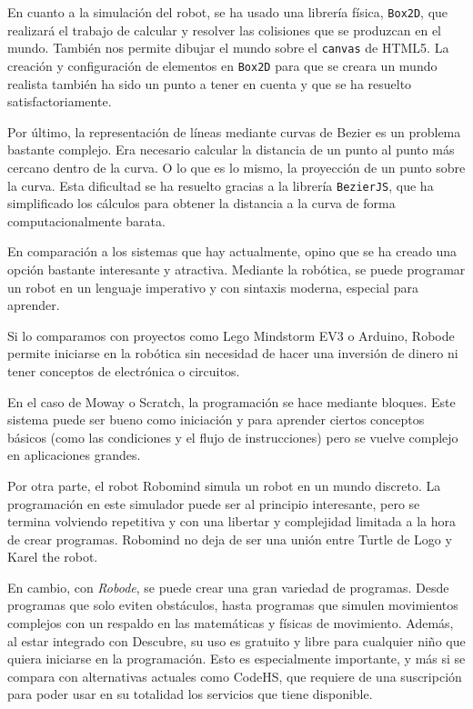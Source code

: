 
En cuanto a la simulación del robot, se ha usado una librería física, \texttt{Box2D}, que realizará el trabajo de calcular y resolver las colisiones que se produzcan en el mundo. También nos permite dibujar el mundo sobre el \texttt{canvas} de HTML5. La creación y configuración de elementos en \texttt{Box2D} para que se creara un mundo realista también ha sido un punto a tener en cuenta y que se ha resuelto satisfactoriamente. 

Por último, la representación de líneas mediante curvas de Bezier es un problema bastante complejo. Era necesario calcular la distancia de un punto al punto más cercano dentro de la curva. O lo que es lo mismo, la proyección de un punto sobre la curva. Esta dificultad se ha resuelto gracias a la librería \texttt{BezierJS}, que ha simplificado los cálculos para obtener la distancia a la curva de forma computacionalmente barata. 


En comparación a los sistemas que hay actualmente, opino que se ha creado una opción bastante interesante y atractiva. Mediante la robótica, se puede programar un robot en un lenguaje imperativo y con sintaxis moderna, especial para aprender. 

Si lo comparamos con proyectos como Lego Mindstorm EV3 o Arduino, Robode permite iniciarse en la robótica sin necesidad de hacer una inversión de dinero ni tener conceptos de electrónica o circuitos.

En el caso de Moway o Scratch, la programación se hace mediante bloques. Este sistema puede ser bueno como iniciación y para aprender ciertos conceptos básicos (como las condiciones y el flujo de instrucciones) pero se vuelve complejo en aplicaciones grandes. 

Por otra parte, el robot Robomind simula un robot en un mundo discreto. La programación en este simulador puede ser al principio interesante, pero se termina volviendo repetitiva y con una libertar y complejidad limitada a la hora de crear programas. Robomind no deja de ser una unión entre Turtle de Logo y Karel the robot. 

En cambio, con \emph{Robode}, se puede crear una gran variedad de programas. Desde programas que solo eviten obstáculos, hasta programas que simulen movimientos complejos con un respaldo en las matemáticas y físicas de movimiento. Además, al estar integrado con Descubre, su uso es gratuito y libre para cualquier niño que quiera iniciarse en la programación. Esto es especialmente importante, y más si se compara con alternativas actuales como CodeHS, que requiere de una suscripción para poder usar en su totalidad los servicios que tiene disponible.



